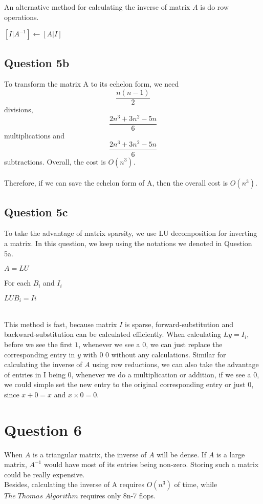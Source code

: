 \documentclass[11pt]{article} %
\begin{document}
An alternative method for calculating the inverse of matrix $A$ is do row operations.\\\linebreak
\centerline{$[I | A^{-1}]\gets[A | I]$}

\subsection{Question 5b}
To transform the matrix A to its echelon form, we need \[\dfrac{n(n-1)}{2}\] divisions, \[\dfrac{2n^{3}+3n^{2}-5n}{6}\] multiplications and \[\dfrac{2n^{3}+3n^{2}-5n}{6}\] subtractions. Overall, the cost is $O(n^{3})$.\\\\
Therefore, if we can save the echelon form of A, then the overall cost is $O(n^{3})$.
 
\subsection{Question 5c}
To take the advantage of matrix sparsity, we use LU decomposition for inverting a matrix. In this question, we keep using the notations we denoted in Question 5a.\linebreak
\centerline{$A = LU$}\linebreak
For each $B_{i}$ and $I_{i}$\\\linebreak
\centerline{$LUB_{i} = I{i}$}\\\linebreak
This method is fast, because matrix $I$ is sparse, forward-substitution and backward-substitution can be calculated efficiently. When calculating $Ly = I_{i}$, before we see the first $1$, whenever we see a $0$, we can just replace the corresponding entry in $y$ with 0 $0$ without any calculations. Similar for calculating the inverse of $A$ using row reductions, we can also take the advantage of entries in I being 0, whenever we do a multiplication or addition, if we see a $0$, we could simple set the new entry to the original corresponding entry or just $0$, since $x+0 = x$ and $x \times 0 =0$. 

\section{Question 6}
When $A$ is a triangular matrix, the inverse of $A$ will be dense. If $A$ is a large matrix, $A^{-1}$ would have most of its entries being non-zero. Storing such a matrix could be really expensive.\\\linebreak
Besides, calculating the inverse of A requires $O(n^{3})$ of time, while $The\;Thomas\;Algorithm$ requires only 8n-7 flops.
\end{document}

